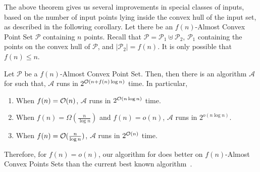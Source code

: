 The above theorem gives us several improvements in special classes of inputs, based on the number of input points lying inside the convex hull of the input set, as described in the following corollary. Let there be an $f(n)$-Almost Convex Point Set $\mathcal P$ containing $n$ points. Recall that $\mathcal{P} = \mathcal{P}_1 \uplus \mathcal{P}_2$, $\mathcal{P}_1$ containing the points on the convex hull of $\mathcal{P}$, and $|\mathcal{P}_2| = f(n)$. It is only possible that $f(n) \leq n$. 

\begin{corollary}\label{almost-better}
Let $\mathcal P$ be a $f(n)$-Almost Convex Point Set. Then, then there is an algorithm $\mathcal{A}$ for \ESMT such that, $\mathcal{A}$ runs in $2^{\mathcal{O}{(n + f(n) \log n)}}$ time. In particular, 
\begin{enumerate}
    \item When $f(n) = \mathcal{O}(n)$, $\mathcal A$ runs in $2^{\mathcal{O}(n\log n)}$ time.
    \item When $f(n) = \Omega(\frac{n}{\log n})$ and $f(n) = o(n)$, $\mathcal{A}$ runs in $2^{o(n\log n)}$.
    \item When $f(n) = \mathcal{O}(\frac{n}{\log n})$, $\mathcal A$ runs in $2^{\mathcal{O}(n)}$ time.
  \end{enumerate}
\end{corollary}

Therefore, for $f(n) = o(n)$, our algorithm for \ESMT does better on $f(n)$-Almost Convex Points Sets than the current best known algorithm~\cite{hwang1986linear}.
    
    
